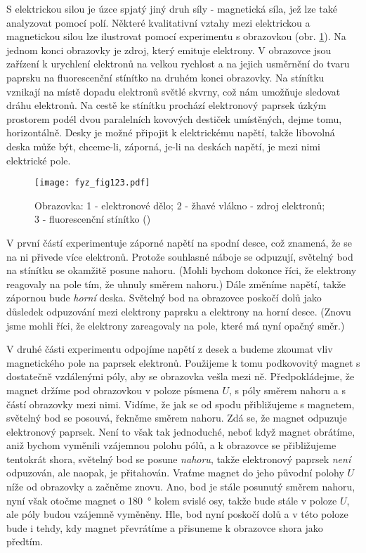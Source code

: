     S elektrickou silou je úzce spjatý jiný druh síly - magnetická síla, jež lze také analyzovat 
    pomocí polí. Některé kvalitativní vztahy mezi elektrickou a magnetickou silou lze ilustrovat 
    pomocí experimentu s obrazovkou (obr. \ref{fyz:fig123}). Na jednom konci obrazovky je zdroj, 
    který emituje elektrony. V obrazovce jsou zařízení k urychlení elektronů na velkou rychlost a 
    na jejich usměrnění do tvaru paprsku na fluorescenční stínítko na druhém konci obrazovky. Na 
    stínítku vznikají na místě dopadu elektronů světlé skvrny, což nám umožňuje sledovat dráhu 
    elektronů. Na cestě ke stínítku prochází elektronový paprsek úzkým prostorem podél dvou 
    paralelních kovových destiček umístěných, dejme tomu, horizontálně. Desky je možné připojit k 
    elektrickému napětí, takže libovolná deska může být, chceme-li, záporná, je-li na deskách 
    napětí, je mezi nimi elektrické pole.
    
    \begin{figure}[ht!]  %
      \centering
      \texttt{[image: fyz\_fig123.pdf]}
      \caption{Obrazovka: 1 - elektronové dělo; 2 - žhavé vlákno - zdroj elektronů; 3 - 
               fluorescenční stínítko 
              (\cite[s.~179]{Feynman01})}
      \label{fyz:fig123}
    \end{figure}
    
    V první částí experimentuje záporné napětí na spodní desce, což znamená, že se na ni přivede 
    více elektronů. Protože souhlasné náboje se odpuzují, světelný bod na stínítku se okamžitě 
    posune nahoru. (Mohli bychom dokonce říci, že elektrony reagovaly na pole tím, že uhnuly směrem 
    nahoru.) Dále změníme napětí, takže zápornou bude \emph{horní} deska. Světelný bod na obrazovce 
    poskočí dolů jako důsledek odpuzování mezi elektrony paprsku a elektrony na horní desce. (Znovu 
    jsme mohli říci, že elektrony zareagovaly na pole, které má nyní opačný směr.)
    
    
    V	druhé části experimentu odpojíme napětí z desek a budeme zkoumat vliv magnetického pole na 
    paprsek elektronů. Použijeme k tomu podkovovitý magnet s dostatečně vzdálenými póly, aby se 
    obrazovka vešla mezi ně. Předpokládejme, že magnet držíme pod obrazovkou v poloze písmena 
    \(U\), s póly směrem nahoru a s částí obrazovky mezi nimi. Vidíme, že jak se od spodu 
    přibližujeme s magnetem, světelný bod se posouvá, řekněme směrem nahoru. Zdá se, že magnet 
    odpuzuje elektronový paprsek. Není to však tak jednoduché, neboť když magnet obrátíme, aniž 
    bychom vyměnili vzájemnou polohu pólů, a k obrazovce se přibližujeme tentokrát shora, světelný 
    bod se posune \emph{nahoru}, takže elektronový paprsek \emph{není} odpuzován, ale naopak, je 
    přitahován. Vraťme magnet do jeho původní polohy \(U\) níže od obrazovky a začněme znovu. Ano, 
    bod je stále posunutý směrem nahoru, nyní však otočme magnet o \SI{180}{\degree} kolem svislé 
    osy, takže bude stále v poloze \(U\), ale póly budou vzájemně vyměněny. Hle, bod nyní poskočí 
    dolů a v této poloze bude i tehdy, kdy magnet převrátíme a přisuneme k obrazovce shora jako 
    předtím.
    
